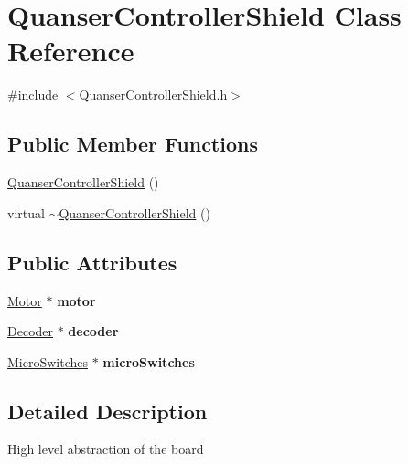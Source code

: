 \hypertarget{classQuanserControllerShield}{}\section{Quanser\+Controller\+Shield Class Reference}
\label{classQuanserControllerShield}


{\ttfamily \#include $<$Quanser\+Controller\+Shield.\+h$>$}

\subsection*{Public Member Functions}
\begin{DoxyCompactItemize}
\item 
\mbox{\hyperlink{classQuanserControllerShield_a965410baa27ff59baa08bf1e49a7f1eb}{Quanser\+Controller\+Shield}} ()
\item 
virtual \mbox{\hyperlink{classQuanserControllerShield_a60b539f19bf54838086557c8c3e7a1bb}{$\sim$\+Quanser\+Controller\+Shield}} ()
\end{DoxyCompactItemize}
\subsection*{Public Attributes}
\begin{DoxyCompactItemize}
\item 
\mbox{\label{classQuanserControllerShield_a7b7642fc075d425ff9ee43909b992f94}} 
\mbox{\hyperlink{classMotor}{Motor}} $\ast$ {\bfseries motor}
\item 
\mbox{\label{classQuanserControllerShield_a83088510efc04475115e835a65a4b9ad}} 
\mbox{\hyperlink{classDecoder}{Decoder}} $\ast$ {\bfseries decoder}
\item 
\mbox{\label{classQuanserControllerShield_a3e52e8fda734c41da7ad6f704ccf0877}} 
\mbox{\hyperlink{classMicroSwitches}{Micro\+Switches}} $\ast$ {\bfseries micro\+Switches}
\end{DoxyCompactItemize}


\subsection{Detailed Description}
High level abstraction of the board 

